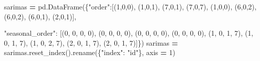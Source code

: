 \documentclass[mstat,12pt]{unswthesis}
\newenvironment{Shaded}{\begin{snugshade}}{\end{snugshade}}
\newcommand{\DecValTok}[1]{\textcolor[rgb]{0.00,0.00,0.81}{#1}}
\newcommand{\NormalTok}[1]{#1}
\newcommand{\OperatorTok}[1]{\textcolor[rgb]{0.81,0.36,0.00}{\textbf{#1}}}
\newcommand{\StringTok}[1]{\textcolor[rgb]{0.31,0.60,0.02}{#1}}
\begin{document}
\begin{Shaded}
\begin{Highlighting}[]
\NormalTok{sarimas }\OperatorTok{=}\NormalTok{ pd.DataFrame(\{}\StringTok{"order"}\NormalTok{:[(}\DecValTok{1}\NormalTok{,}\DecValTok{0}\NormalTok{,}\DecValTok{0}\NormalTok{), (}\DecValTok{1}\NormalTok{,}\DecValTok{0}\NormalTok{,}\DecValTok{1}\NormalTok{), (}\DecValTok{7}\NormalTok{,}\DecValTok{0}\NormalTok{,}\DecValTok{1}\NormalTok{), (}\DecValTok{7}\NormalTok{,}\DecValTok{0}\NormalTok{,}\DecValTok{7}\NormalTok{), }
\NormalTok{                                (}\DecValTok{1}\NormalTok{,}\DecValTok{0}\NormalTok{,}\DecValTok{0}\NormalTok{), (}\DecValTok{6}\NormalTok{,}\DecValTok{0}\NormalTok{,}\DecValTok{2}\NormalTok{), (}\DecValTok{6}\NormalTok{,}\DecValTok{0}\NormalTok{,}\DecValTok{2}\NormalTok{), (}\DecValTok{6}\NormalTok{,}\DecValTok{0}\NormalTok{,}\DecValTok{1}\NormalTok{), }
\NormalTok{                                (}\DecValTok{2}\NormalTok{,}\DecValTok{0}\NormalTok{,}\DecValTok{1}\NormalTok{)],}
                                
                        \StringTok{"seasonal\_order"}\NormalTok{: [(}\DecValTok{0}\NormalTok{, }\DecValTok{0}\NormalTok{, }\DecValTok{0}\NormalTok{, }\DecValTok{0}\NormalTok{), (}\DecValTok{0}\NormalTok{, }\DecValTok{0}\NormalTok{, }\DecValTok{0}\NormalTok{, }\DecValTok{0}\NormalTok{), }
\NormalTok{                                          (}\DecValTok{0}\NormalTok{, }\DecValTok{0}\NormalTok{, }\DecValTok{0}\NormalTok{, }\DecValTok{0}\NormalTok{), (}\DecValTok{0}\NormalTok{, }\DecValTok{0}\NormalTok{, }\DecValTok{0}\NormalTok{, }\DecValTok{0}\NormalTok{), }
\NormalTok{                                          (}\DecValTok{1}\NormalTok{, }\DecValTok{0}\NormalTok{, }\DecValTok{1}\NormalTok{, }\DecValTok{7}\NormalTok{), (}\DecValTok{1}\NormalTok{, }\DecValTok{0}\NormalTok{, }\DecValTok{1}\NormalTok{, }\DecValTok{7}\NormalTok{), }
\NormalTok{                                          (}\DecValTok{1}\NormalTok{, }\DecValTok{0}\NormalTok{, }\DecValTok{2}\NormalTok{, }\DecValTok{7}\NormalTok{), (}\DecValTok{2}\NormalTok{, }\DecValTok{0}\NormalTok{, }\DecValTok{1}\NormalTok{, }\DecValTok{7}\NormalTok{), }
\NormalTok{                                          (}\DecValTok{2}\NormalTok{, }\DecValTok{0}\NormalTok{, }\DecValTok{1}\NormalTok{, }\DecValTok{7}\NormalTok{)]\})}
\NormalTok{sarimas }\OperatorTok{=}\NormalTok{ sarimas.reset\_index().rename(\{}\StringTok{"index"}\NormalTok{: }\StringTok{"id"}\NormalTok{\}, axis }\OperatorTok{=} \DecValTok{1}\NormalTok{)}


\end{Highlighting}
\end{Shaded}
\end{document}
